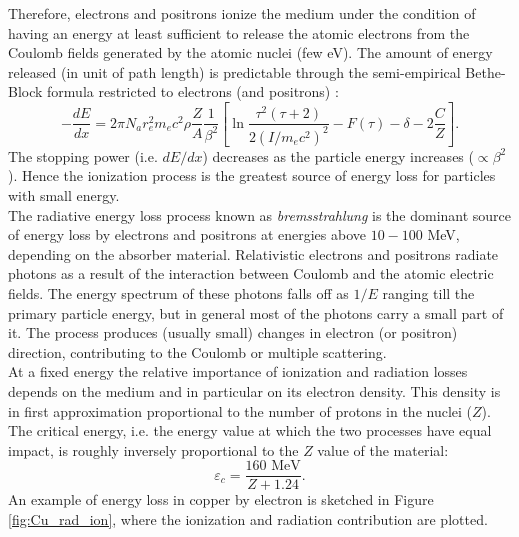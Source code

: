 Therefore, electrons and positrons ionize the medium under the condition of having an energy at least sufficient to release the atomic electrons from the Coulomb fields generated by the atomic nuclei (few eV).
The amount of energy released (in unit of path length) is predictable through the semi-empirical Bethe-Block formula restricted to electrons (and positrons) \cite{Leo}:
\begin{equation}
    -\frac{dE}{dx} = 2\pi N_a r_e^2 m_e c^2 \rho \frac{Z}{A}\frac{1}{\beta^2}\left[ \ln{\frac{\tau^2(\tau + 2)}{2(I/m_ec^2)^2}} -F(\tau) -\delta -2\frac{C}{Z}\right].
\end{equation}
The stopping power (i.e. $dE/dx$) decreases as the particle energy increases ($\propto \beta^2$). Hence the ionization process is the greatest source of energy loss for particles with small energy.\\
The radiative energy loss process known as \textit{bremsstrahlung} is the dominant source of energy loss by electrons and positrons at energies above $10-100$ MeV, depending on the absorber material. Relativistic electrons and positrons radiate photons as a result of the interaction between Coulomb and the atomic electric fields. The energy spectrum of these photons falls off as $1/E$ ranging till the primary particle energy, but in general most of the photons carry a small part of it.
The process produces (usually small) changes in electron (or positron) direction, contributing to the Coulomb or multiple scattering.\\
At a fixed energy the relative importance of ionization and radiation losses depends on the medium and in particular on its electron density.
This density is in first approximation proportional to the number of protons in the nuclei ($Z$).
The critical energy, i.e. the energy value at which the two processes have equal impact, is roughly inversely proportional to the $Z$ value of the material:
\begin{equation}
    \varepsilon_c = \frac{160\text{ MeV}}{Z + 1.24}.
\end{equation}
An example of energy loss in copper by electron is sketched in Figure \ref{fig:Cu_rad_ion}, where the ionization and radiation contribution are plotted.\\

